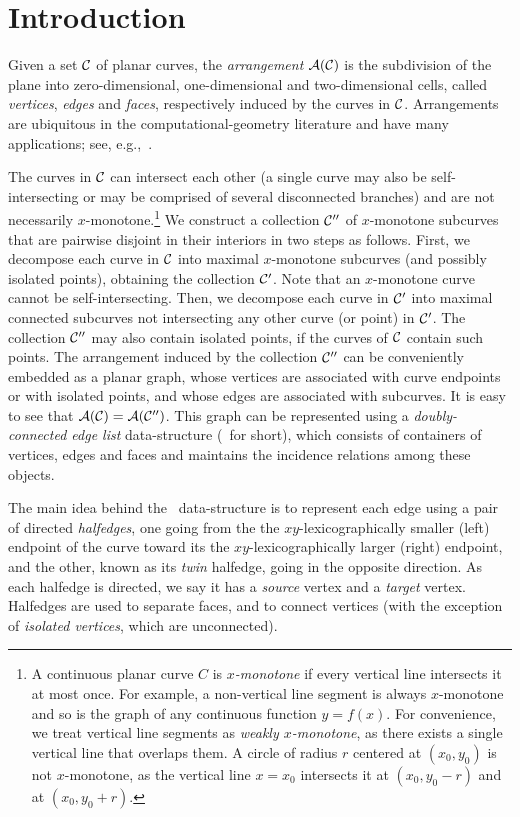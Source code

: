 \section{Introduction}
\label{arr_sec:intro}

Given a set ${\cal C}$ of planar curves, the {\em arrangement}
${\cal A}({\cal C})$ is the subdivision of the plane into zero-dimensional,
one-dimensional and two-dimensional cells, called {\em vertices}, {\em
edges} and {\em faces}, respectively induced by the curves in ${\cal C}$.
Arrangements are ubiquitous in the computational-geometry
literature and have many applications;
see, e.g.,~\cite{as-aa-00,cgal:h-a-04}.

The curves in ${\cal C}$ can intersect each other (a single curve may also
be self-intersecting or may be comprised of several disconnected branches)
and are not necessarily $x$-monotone.\footnote{A continuous planar curve $C$
is {\em $x$-monotone} if every vertical line intersects it at
most once. For example, a non-vertical line segment is always
$x$-monotone and so is the graph of any continuous function $y = f(x)$.
For convenience, we treat vertical line segments as {\em weakly
$x$-monotone}, as there exists a single vertical line that overlaps them.
A circle of radius $r$ centered at $(x_0, y_0)$ is not $x$-monotone, as
the vertical line $x = x_0$ intersects it at $(x_0, y_0 - r)$ and at
$(x_0, y_0 + r)$.}
We construct a collection ${\cal C}''$ of
$x$-monotone subcurves that are pairwise disjoint in their interiors
in two steps as follows. First, we decompose each curve in ${\cal C}$
into maximal $x$-monotone subcurves (and possibly isolated points),
obtaining the collection ${\cal C}'$. Note that an $x$-monotone curve cannot
be self-intersecting. Then, we decompose each curve in ${\cal C}'$ into
maximal connected subcurves not intersecting any other
curve (or point) in ${\cal C}'$. The collection ${\cal C}''$ may also
contain isolated points, if the curves of ${\cal C}$ contain such
points. The arrangement induced by the collection ${\cal C}''$ can be
conveniently embedded as a planar graph, whose vertices are associated
with curve endpoints or with isolated points, and whose edges are
associated with subcurves. It is easy to see that
${\cal A}({\cal C}) = {\cal A}({\cal C}'')$. This graph can be represented using a
{\em doubly-connected edge list} data-structure (\dcel\ for short),
which consists of containers of vertices, edges and faces and
maintains the incidence relations among these objects.

The main idea behind the \dcel\ data-structure is to represent
each edge using a pair of directed {\em halfedges}, one going from
the the $xy$-lexicographically smaller (left) endpoint of the curve toward
its the $xy$-lexicographically larger (right) endpoint, and the other,
known as its {\em twin} halfedge, going in the opposite direction. As each
halfedge is directed, we say it has a {\em source} vertex and a {\em target}
vertex. Halfedges are used to separate faces, and to
connect vertices (with the exception of {\em isolated vertices}, which
are unconnected).

